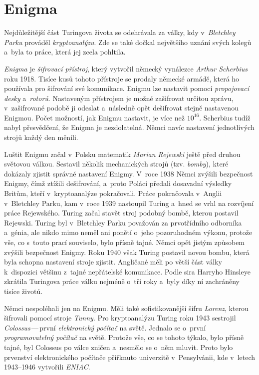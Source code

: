 \documentclass[a4paper, 11pt]{article}
\begin{document}
\section{Enigma}

Nejdůležitější část Turingova života se odehrávala za války, kdy
v~\emph{Bletchley Parku} prováděl \emph{kryptoanalýzu}. Zde se také dočkal
největšího uznání svých kolegů a~byla to práce, která jej zcela pohltila.

\emph{Enigma} je \emph{šifrovací přístroj}, který vytvořil německý vynálezce
\emph{Arthur Scherbius} roku 1918. Tisíce kusů tohoto přístroje se prodaly
německé armádě, která ho používala pro šifrování své komunikace. Enigmu lze
nastavit pomocí \emph{propojovací desky} a~\emph{rotorů}. Nastaveným
přístrojem je možné zašifrovat určitou zprávu, v~zašifrované podobě ji
odeslat a~následně opět dešifrovat stejně nastavenou Enigmou. Počet možností,
jak Enigmu nastavit, je více než $ 10^{16} $. Scherbius tudíž nabyl
přesvědčení, že Enigma je nezdolatelná. Němci navíc nastavení jednotlivých
strojů každý den měnili.

Luštit Enigmu začal v~Polsku matematik \emph{Marian Rejewski} ještě před
druhou světovou válkou. Sestavil několik mechanických strojů (tzv.
\emph{bomby}), které dokázaly zjistit správné nastavení Enigmy. V~roce 1938
Němci zvýšili bezpečnost Enigmy, čímž ztížili dešifrování, a~proto Poláci
předali dosavadní výsledky Britům, kteří v~kryptoanalýze pokračovali. Práce
pokračovala v~Anglii v~Bletchley Parku, kam v~roce 1939 nastoupil Turing
a~hned se vrhl na rozvíjení práce Rejewského. Turing začal stavět stroj
podobný bombě, kterou postavil Rejewski. Turing byl v~Bletchley Parku považován
za prvotřídního odborníka a~génia, ale nikdo mimo neměl ani ponětí o~jeho
pozoruhodném výkonu, protože vše, co s~touto prací souviselo, bylo přísně
tajné. Němci opět jistým způsobem zvýšili bezpečnost Enigmy. Roku 1940 však
Turing postavil novou bombu, která byla schopna nastavení stroje zjistit.
Angličané měli po větší část války k~dispozici většinu z~tajné nepřátelské
komunikace. Podle sira Harryho Hinsleye zkrátila Turingova práce válku
nejméně o~tři roky a~byly díky ní zachráněny tisíce životů.

Němci nespoléhali jen na Enigmu. Měli také sofistikovanější šifru
\emph{Lorenz}, kterou šifrovali pomocí stroje \emph{Tunny}. Pro kryptoanalýzu
Turing roku 1943 sestrojil \emph{Colossus}\,---\,první \emph{elektronický
počítač} na světě. Jednalo se o~první \emph{programovatelný počítač} na světě.
Protože vše, co se tohoto týkalo, bylo přísně tajné, byl Colossus po válce
zničen a~nesmělo se o~něm mluvit. Proto bylo prvenství elektronického
počítače přiřknuto univerzitě v~Pensylvánii, kde v~letech 1943--1946
vytvořili \emph{ENIAC}.
\end{document}
